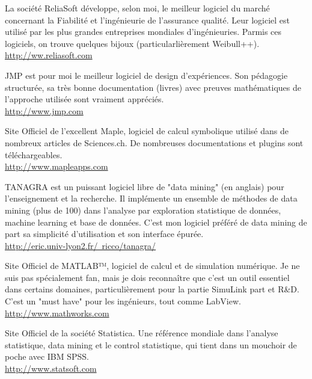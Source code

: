 	{\Large {}}{\Large {}}{\Large {}}{\Large {}} La société ReliaSoft développe, selon moi, le meilleur logiciel du marché concernant la Fiabilité et l'ingénieurie de l'assurance qualité. Leur logiciel est utilisé par les plus grandes entreprises mondiales d'ingénieuries. Parmis ces logiciels, on trouve quelques bijoux (particularlièrement Weibull++).\\
	\href{http://ww.reliasoft.com}{\color{blue}http://ww.reliasoft.com}
	
	{\Large {}}{\Large {}}{\Large {}} JMP est pour moi le meilleur logiciel de design d'expériences. Son pédagogie structurée, sa très bonne documentation (livres) avec preuves mathématiques de l'approche utilisée sont vraiment appréciés.\\
	\href{http://www.jmp.com}{\color{blue}http://www.jmp.com}
	
	{\Large {}}{\Large {}}{\Large {}}{\Large {}} Site Officiel de l'excellent Maple, logiciel de calcul symbolique utilisé dans de nombreux articles de Sciences.ch. De nombreuses documentations et plugins sont téléchargeables.\\
	\href{http://www.mapleapps.com}{\color{blue}http://www.mapleapps.com}
	
	{\Large {}}{\Large {}}{\Large {}}{\Large {}}\bcdfrance{} TANAGRA est un puissant logiciel libre de "data mining" (en anglais) pour l'enseignement et la recherche. Il implémente un ensemble de méthodes de data mining (plus de 100) dans l'analyse par exploration statistique de données, machine learning et base de données. C'est mon logiciel préféré de data mining de part sa simplicité d'utilisation et son interface épurée.\\
	\href{http://eric.univ-lyon2.fr/~ricco/tanagra/}{\color{blue}http://eric.univ-lyon2.fr/~ricco/tanagra/}
	
	{\Large {}}{\Large {}}{\Large {}} Site Officiel de MATLAB™, logiciel de calcul et de simulation numérique. Je ne suis pas spécialement fan, mais je dois reconnaître que c'est un outil essentiel dans certains domaines, particulièrement pour la partie SimuLink part et R\&D. C'est un "must have" pour les ingénieurs, tout comme LabView.\\
	\href{http://www.mathworks.com}{\color{blue}http://www.mathworks.com}
	
	\pagebreak
	{\Large {}}{\Large {}}{\Large {}}Site Officiel de la société Statistica. Une référence mondiale dans l'analyse statistique, data mining et le control statistique, qui tient dans un mouchoir de poche avec IBM SPSS.\\
	\href{http://www.statsoft.com}{\color{blue}http://www.statsoft.com}
	

